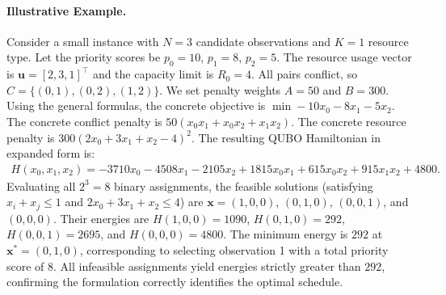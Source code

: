 \documentclass[12pt]{article}
\begin{document}
\paragraph{Illustrative Example.}
Consider a small instance with $N=3$ candidate observations and $K=1$ resource type. Let the priority scores be $p_0 = 10$, $p_1 = 8$, $p_2 = 5$. The resource usage vector is $\mathbf{u} = [2, 3, 1]^\top$ and the capacity limit is $R_0 = 4$. All pairs conflict, so $C = \{(0,1), (0,2), (1,2)\}$. We set penalty weights $A = 50$ and $B = 300$.
Using the general formulas, the concrete objective is $\min -10 x_0 - 8 x_1 - 5 x_2$. The concrete conflict penalty is $50(x_0 x_1 + x_0 x_2 + x_1 x_2)$. The concrete resource penalty is $300(2 x_0 + 3 x_1 + x_2 - 4)^2$.
The resulting QUBO Hamiltonian in expanded form is:
\begin{align}
H(x_0, x_1, x_2) = -3710 x_0 - 4508 x_1 - 2105 x_2 + 1815 x_0 x_1 + 615 x_0 x_2 + 915 x_1 x_2 + 4800.
\end{align}
Evaluating all $2^3 = 8$ binary assignments, the feasible solutions (satisfying $x_i + x_j \le 1$ and $2x_0 + 3x_1 + x_2 \le 4$) are $\mathbf{x} = (1,0,0)$, $(0,1,0)$, $(0,0,1)$, and $(0,0,0)$. Their energies are $H(1,0,0) = 1090$, $H(0,1,0) = 292$, $H(0,0,1) = 2695$, and $H(0,0,0) = 4800$. The minimum energy is $292$ at $\mathbf{x}^* = (0,1,0)$, corresponding to selecting observation 1 with a total priority score of $8$. All infeasible assignments yield energies strictly greater than $292$, confirming the formulation correctly identifies the optimal schedule.
\end{document}
